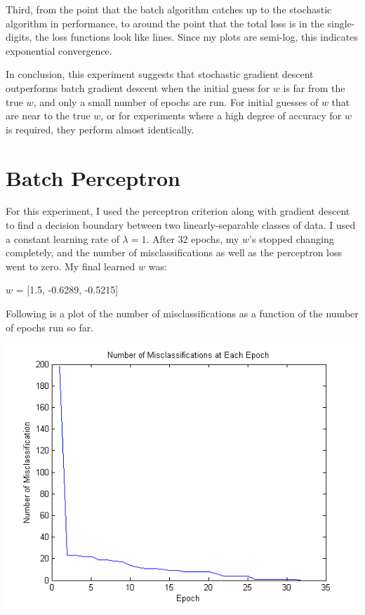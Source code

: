 \documentclass{article}
\begin{document}
Third, from the point that the batch algorithm catches up to the stochastic algorithm in performance, to around the point that the total loss is in the single-digits, the loss functions look like lines. Since my plots are semi-log, this indicates exponential convergence.

In conclusion, this experiment suggests that stochastic gradient descent outperforms batch gradient descent when the initial guess for $w$ is far from the true $w$, and only a small number of epochs are run. For initial guesses of $w$ that are near to the true $w$, or for experiments where a high degree of accuracy for $w$ is required, they perform almost identically.

\section{Batch Perceptron}

For this experiment, I used the perceptron criterion along with gradient descent to find a decision boundary between two linearly-separable classes of data. I used a constant learning rate of $\lambda = 1$. After 32 epochs, my $w$'s stopped changing completely, and the number of misclassifications as well as the perceptron loss went to zero. My final learned $w$ was:

$w$ = [1.5, -0.6289, -0.5215]

Following is a plot of the number of misclassifications as a function of the number of epochs run so far. 

\includegraphics[scale=0.75]{perceptron_progress.png}
\end{document}
